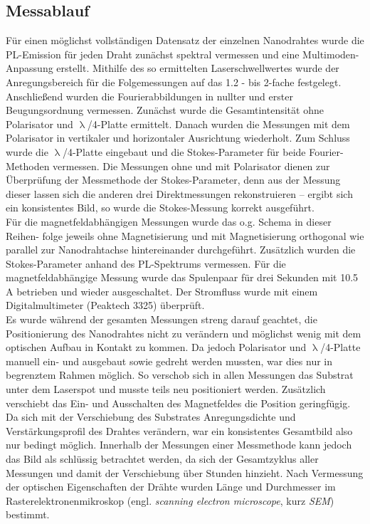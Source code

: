 \subsection{Messablauf}
Für einen möglichst vollständigen Datensatz der einzelnen Nanodrahtes wurde die PL-Emission für jeden Draht zunächst spektral vermessen und eine Multimoden-Anpassung erstellt. Mithilfe des so ermittelten Laserschwellwertes wurde der Anregungsbereich für die Folgemessungen auf das 1.2 - bis 2-fache festgelegt. Anschließend wurden die Fourierabbildungen in nullter und erster Beugungsordnung vermessen. Zunächst wurde die Gesamtintensität ohne Polarisator und $\uplambda$/4-Platte ermittelt. Danach wurden die Messungen mit dem Polarisator in vertikaler und horizontaler Ausrichtung wiederholt. Zum Schluss wurde die $\uplambda$/4-Platte eingebaut und die Stokes-Parameter für beide Fourier-Methoden vermessen. Die Messungen ohne und mit Polarisator dienen zur Überprüfung der Messmethode der Stokes-Parameter, denn aus der Messung dieser lassen sich die anderen drei Direktmessungen rekonstruieren – ergibt sich ein konsistentes Bild, so wurde die Stokes-Messung korrekt ausgeführt.
\\
Für die magnetfeldabhängigen Messungen wurde das o.g. Schema in dieser Reihen- folge jeweils ohne Magnetisierung und mit Magnetisierung orthogonal wie parallel zur Nanodrahtachse hintereinander durchgeführt. Zusätzlich wurden die Stokes-Parameter anhand des PL-Spektrums vermessen. Für die magnetfeldabhängige Messung wurde das Spulenpaar für drei Sekunden mit 10.5 A betrieben und wieder ausgeschaltet. Der Stromfluss wurde mit einem Digitalmultimeter (Peaktech 3325) überprüft. 
\\
Es wurde während der gesamten Messungen streng darauf geachtet, die Positionierung des Nanodrahtes nicht zu verändern und möglichst wenig mit dem optischen Aufbau in Kontakt zu kommen. Da jedoch Polarisator und $\uplambda$/4-Platte manuell ein- und ausgebaut sowie gedreht werden mussten, war dies nur in begrenztem Rahmen möglich. So verschob sich in allen Messungen das Substrat unter dem Laserspot und musste teils neu positioniert werden. Zusätzlich verschiebt das Ein- und Ausschalten des Magnetfeldes die Position geringfügig. Da sich mit der Verschiebung des Substrates Anregungsdichte und Verstärkungsprofil des Drahtes verändern, war ein konsistentes Gesamtbild also nur bedingt möglich. Innerhalb der Messungen einer Messmethode kann jedoch das Bild als schlüssig betrachtet werden, da sich der Gesamtzyklus aller Messungen und damit der Verschiebung über Stunden hinzieht. Nach Vermessung der optischen Eigenschaften der Drähte wurden Länge und Durchmesser im Rasterelektronenmikroskop (engl. \textit{scanning electron microscope}, kurz \textit{SEM}) bestimmt.
